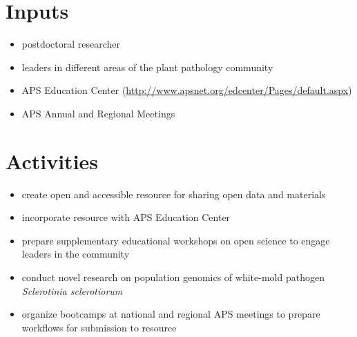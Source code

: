 \documentclass[12pt,letterpaper]{article}
\begin{document}


\section{Inputs}


\begin{itemize}
	\item postdoctoral researcher
	\item leaders in different areas of the plant pathology community
	\item APS Education Center (\url{http://www.apsnet.org/edcenter/Pages/default.aspx})
	\item APS Annual and Regional Meetings
\end{itemize}

\section{Activities}


\begin{itemize}
	\item create open and accessible resource for sharing open data and materials
	\item incorporate resource with APS Education Center
	\item prepare supplementary educational workshops on open science to engage leaders in the community 
	\item conduct novel research on population genomics of white-mold pathogen \textit{Sclerotinia sclerotiorum}
	\item organize bootcamps at national and regional APS meetings to prepare workflows for submission to resource
\end{itemize}
\end{document}
